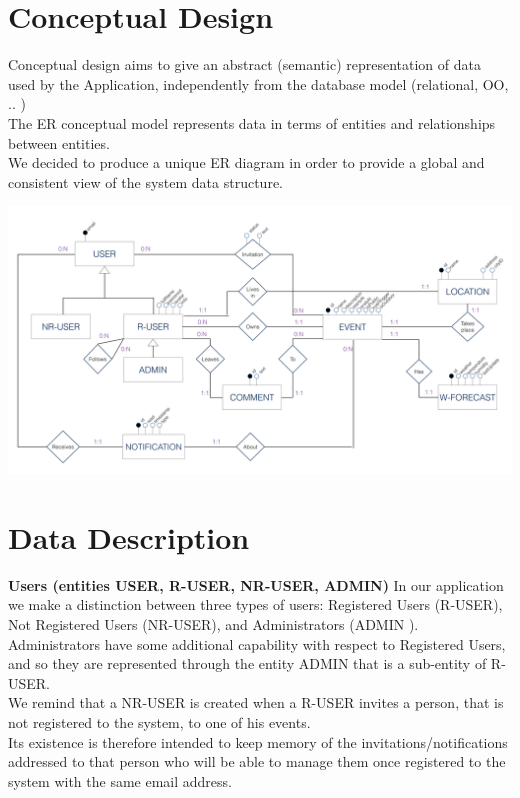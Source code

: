 \documentclass[12pt]{book}
\begin{document}
\section{Conceptual Design}
Conceptual design aims to give an abstract (semantic) representation of data used by the Application, independently from the database model (relational, OO, .. )\\
The ER conceptual model represents data in terms of entities and relationships between entities.\\
We decided to produce a unique ER diagram in order to provide a global and consistent view of the system data structure.\\

\newpage 
\begin{landscape}
\includegraphics[scale=0.2]{er}\\
\end{landscape}

\section{Data Description}
\textbf{Users (entities USER, R-USER, NR-USER, ADMIN)}
In our application we make a distinction between three types of users: Registered Users (R-USER), Not Registered Users (NR-USER), and Administrators (ADMIN ).\\
Administrators have some additional capability with respect to Registered Users, and so they are represented through the entity ADMIN that is a sub-entity of R-USER.\\

We remind that a NR-USER is created when a R-USER invites a person, that is not registered to the system, to one of his events.\\
Its existence is therefore intended to keep memory of the invitations/notifications addressed to that person who will be able to manage them once registered to the system with the same email address.\\
\end{document}
